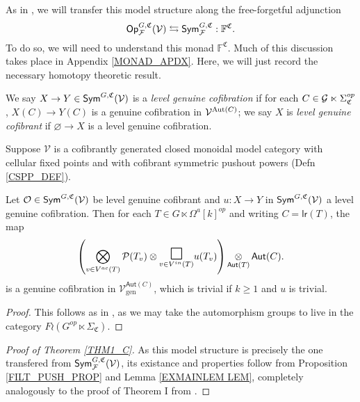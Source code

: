 \documentclass[a4paper,10pt
,draft
]{article}%
\renewcommand{\F}{\mathcal F}
\renewcommand{\1}{\eta}%
\newcommand{\SC}{\Sigma_{\mathfrak C}}
\begin{document}
As in \cite{BP_geo}, we will transfer this model structure along the free-forgetful adjunction
\[
      \Op^{G, \mathfrak C}_\F(\V) \leftrightarrows \Sym^{G, \mathfrak C}_\F: \mathbb F^{\mathfrak C}.
\]
To do so, we will need to understand this monad $\mathbb F^{\mathfrak C}$.
Much of this discussion takes place in Appendix \ref{MONAD_APDX}.
Here, we will just record the necessary homotopy theoretic result.

We say $X \to Y \in \mathsf{Sym}^{G, \mathfrak C}(\mathcal V)$ is a \textit{level genuine cofibration} if for each $C \in \G \ltimes \SC^{op}$,
$X(C) \to Y(C)$ is a genuine cofibration in $\mathcal V^{\operatorname{Aut}(C)}$;
we say $X$ is \textit{level genuine cofibrant} if $\varnothing \to X$ is a level genuine cofibration.

\begin{lemma} %
      \label{EXMAINLEM LEM}
      Suppose $\mathcal{V}$ is a cofibrantly generated closed monoidal model category
      with cellular fixed points and
      with cofibrant symmetric pushout powers (Defn \ref{CSPP_DEF}).
      
      Let $\mathcal{O} \in \mathsf{Sym}^{G,\mathfrak C}(\mathcal{V})$
      be level genuine cofibrant
      and  
      $u: X \to Y$ in $\mathsf{Sym}^{G, \mathfrak C}(\mathcal V)$ a level genuine cofibration. 
      Then for each $T \in G \ltimes \Omega^a[k]^{op}$ and writing
      $C = \mathsf{lr}(T)$, the map	
      \begin{equation}\label{EXMAINLEM EQ}
            \left(
                  \bigotimes\limits_{v \in V^{ac}(T)}\P(T_v) \otimes
                  \underset{v \in V^{in}(T)}
                  {\mathlarger{\mathlarger{\mathlarger{\square}}}}
                  u(T_v)
            \right) 
            \mathop{\otimes}\limits_{\mathsf{Aut}(T)} \mathsf{Aut}(C).
      \end{equation}
      is a genuine cofibration in 
      $\mathcal{V}^{\mathsf{Aut}(C)}_{\text{gen}}$,
      which is trivial if $k \geq 1$ and $u$ is trivial.	
\end{lemma}
\begin{proof}
      This follows as in \cite{BP_geo}, as we may take the automorphism groups to live in the category $F \wr (G^{op} \ltimes \Sigma_{\mathfrak C}).$ 
\end{proof}

\begin{proof}[Proof of Theorem \ref{THM1_C}]
      As this model structure is precisely the one transfered from $\Sym^{G, \mathfrak C}_\F(\V)$,
      its existance and properties follow from
      Proposition \ref{FILT_PUSH_PROP} and Lemma \ref{EXMAINLEM LEM},
      completely analogously to the proof of Theorem I from \cite{BP_geo}.
\end{proof}
\end{document}
